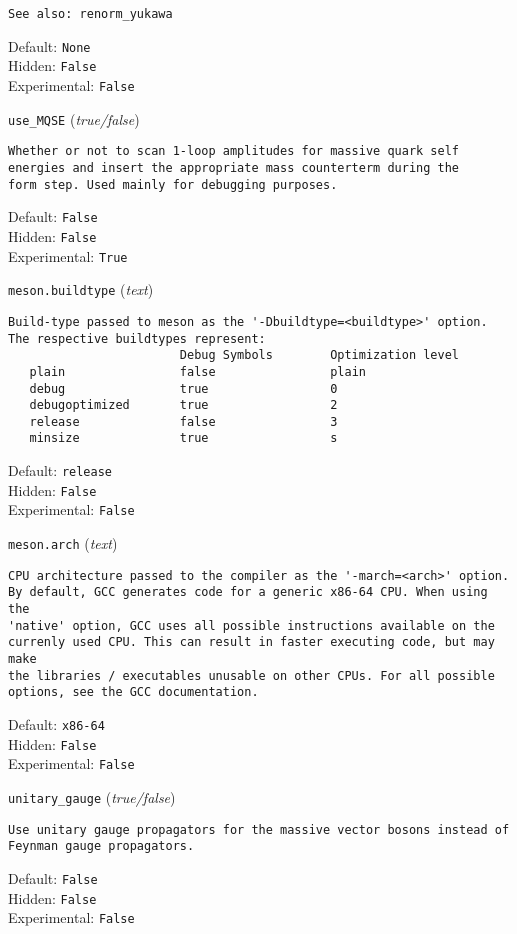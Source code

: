 \begin{basedescript}{\desclabelstyle{\pushlabel}}
\begin{verbatim}
See also: renorm_yukawa
\end{verbatim}
Default: \verb|None|
\\Hidden: \verb|False|
\\Experimental: \verb|False|
\\\item[\colorbox{gray!30}{\texttt{use\_MQSE}}] (\textit{true/false})
\begin{verbatim}
Whether or not to scan 1-loop amplitudes for massive quark self
energies and insert the appropriate mass counterterm during the
form step. Used mainly for debugging purposes.
\end{verbatim}
Default: \verb|False|
\\Hidden: \verb|False|
\\Experimental: \verb|True|
\\\item[\colorbox{gray!30}{\texttt{meson.buildtype}}] (\textit{text})
\begin{verbatim}
Build-type passed to meson as the '-Dbuildtype=<buildtype>' option.
The respective buildtypes represent:
                        Debug Symbols        Optimization level
   plain                false                plain
   debug                true                 0
   debugoptimized       true                 2
   release              false                3
   minsize              true                 s
\end{verbatim}
Default: \verb|release|
\\Hidden: \verb|False|
\\Experimental: \verb|False|
\\\item[\colorbox{gray!30}{\texttt{meson.arch}}] (\textit{text})
\begin{verbatim}
CPU architecture passed to the compiler as the '-march=<arch>' option.
By default, GCC generates code for a generic x86-64 CPU. When using the
'native' option, GCC uses all possible instructions available on the
currenly used CPU. This can result in faster executing code, but may make
the libraries / executables unusable on other CPUs. For all possible
options, see the GCC documentation.
\end{verbatim}
Default: \verb|x86-64|
\\Hidden: \verb|False|
\\Experimental: \verb|False|
\\\item[\colorbox{gray!30}{\texttt{unitary\_gauge}}] (\textit{true/false})
\begin{verbatim}
Use unitary gauge propagators for the massive vector bosons instead of
Feynman gauge propagators.
\end{verbatim}
Default: \verb|False|
\\Hidden: \verb|False|
\\Experimental: \verb|False|
\\\end{basedescript}
